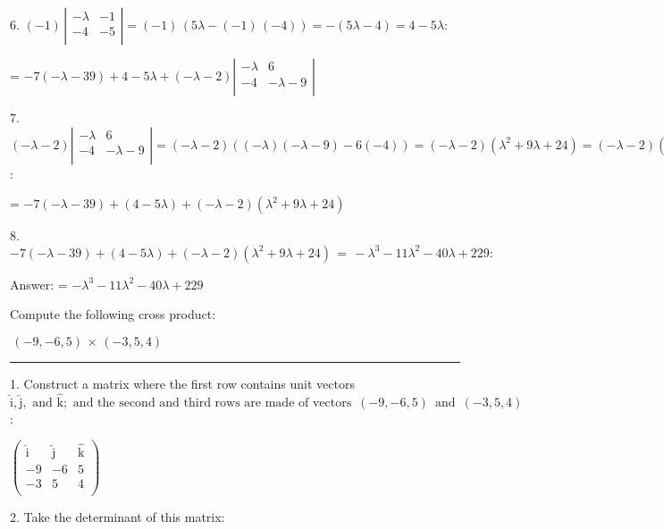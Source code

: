 \documentclass{article}
\begin{document}
6. $(-1)\, \left|
    \begin{array}{cc}
-\lambda & -1 \\
      -4       & -5 \\
    \end{array}
    \right| =(-1)\, (5 \lambda -(-1)\, (-4))=-(5 \lambda -4)=4-5 \lambda $:

= $-7 (-\lambda -39)+4-5 \lambda +(-\lambda -2) \left|
    \begin{array}{cc}
-\lambda & 6           \\
      -4       & -\lambda -9 \\
    \end{array}
    \right|$

7. $(-\lambda -2) \left|
    \begin{array}{cc}
-\lambda & 6           \\
      -4       & -\lambda -9 \\
    \end{array}
    \right| =(-\lambda -2) ((-\lambda ) (-\lambda -9)-6 (-4))=(-\lambda -2) \left(\lambda ^2+9 \lambda +24\right)=(-\lambda -2) \left(\lambda ^2+9 \lambda +24\right)$:

= $-7 (-\lambda -39)+(4-5 \lambda )+(-\lambda -2) \left(\lambda ^2+9 \lambda +24\right)$

8. $-7 (-\lambda -39)+(4-5 \lambda )+(-\lambda -2) \left(\lambda ^2+9 \lambda +24\right)\, =\, -\lambda ^3-11 \lambda ^2-40 \lambda +229:$

Answer: = $-\lambda ^3-11 \lambda ^2-40 \lambda +229$

\pagebreak

Compute the following cross product:

$\, (-9,-6,5)\, \times \, (-3,5,4)\,$

\hrule

1. Construct a matrix where the first row contains unit vectors $\hat{\text{i}}, \hat{\text{j}},\text{ and }\hat{\text{k}};\text{ and the second and third rows are made of vectors }\, (-9,-6,5)\,\text{  and }\, (-3,5,4)\,$ :

$\left(
\begin{array}{ccc}
\hat{\text{i}} & \hat{\text{j}} & \hat{\text{k}} \\
 -9 & -6 & 5 \\
 -3 & 5 & 4 \\
\end{array}
\right)$

2. Take the determinant of this matrix:
\end{document}
